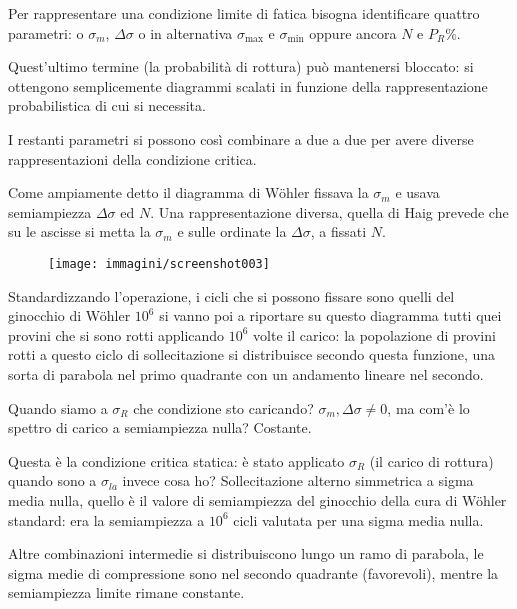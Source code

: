 \documentclass{article}
\begin{document}
\begin{adjustwidth}{2in}{}
			Per rappresentare una condizione limite di fatica bisogna identificare quattro parametri: o $\sigma_m$, $\Delta\sigma$ o in alternativa $\sigma_{\max}$ e $\sigma_{\min}$ oppure ancora $N$ e $P_R\%$. 
			
			Quest'ultimo termine (la probabilità di rottura) può mantenersi bloccato: si ottengono semplicemente diagrammi scalati in funzione della rappresentazione probabilistica di cui si necessita. 
			
			I restanti parametri si possono così combinare a due a due per avere diverse rappresentazioni della condizione critica. \newline 
			
			Come ampiamente detto il diagramma di Wöhler fissava la $\sigma_m$ e usava semiampiezza $\Delta \sigma$ ed $N$. 
			\newpage
			Una rappresentazione diversa, quella di Haig prevede che su le ascisse si metta la $\sigma_m$ e sulle ordinate la $\Delta \sigma$, a fissati $N$.
			\begin{figure}[H]
				\centering
				\texttt{[image: immagini/screenshot003]}
				\label{fig:screenshot003}
			\end{figure}			
			Standardizzando l'operazione, i cicli che si possono fissare sono quelli del ginocchio di Wöhler $10^6$ si vanno poi a riportare su questo diagramma tutti quei provini che si sono rotti applicando $10^6$ volte il carico: la popolazione di provini rotti a questo ciclo di sollecitazione si distribuisce secondo questa funzione, una sorta di parabola nel primo quadrante con un andamento lineare nel secondo. \newline
			
			Quando siamo a $\sigma_R$ che condizione sto caricando? $\sigma_m, \Delta\sigma\ne0$, ma com'è lo spettro di carico a semiampiezza nulla? Costante.
			
			Questa è la condizione critica statica: è stato applicato $\sigma_R$ (il carico di rottura) quando sono a $\sigma_{la}$ invece cosa ho? Sollecitazione alterno simmetrica a sigma media nulla, quello è il valore di semiampiezza del ginocchio della cura di Wöhler standard: era la semiampiezza a $10^6$ cicli valutata per una sigma media nulla. 
			
			Altre combinazioni intermedie si distribuiscono lungo un ramo di parabola, le sigma medie di compressione sono nel secondo quadrante (favorevoli), mentre la semiampiezza limite rimane constante. \newline 
			 

\end{adjustwidth}
\end{document}
